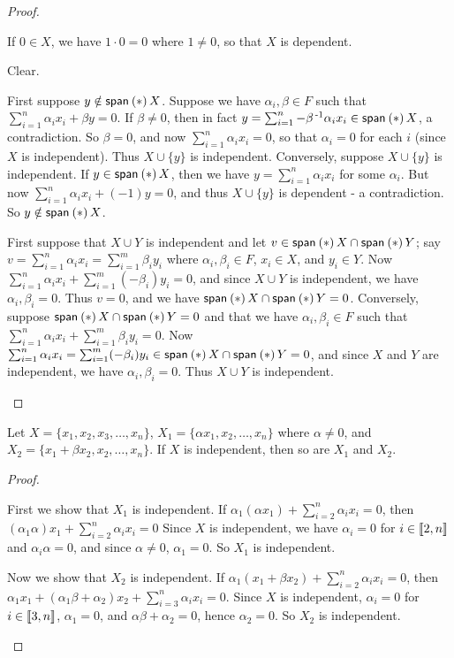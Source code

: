 \documentclass{memoir}
\begin{document}
\begin{proof} \mbox{}
\begin{enumerate*}
\item If $0 \in X$, we have $1 \cdot 0 = 0$ where $1 \neq 0$, so that $X$ is dependent.
\item Clear.
\item First suppose $y \notin \operatorname{\mathsf{span}}_{}\left(*\right){X}$. Suppose we have $\alpha_i,\beta \in F$ such that $\sum_{i=1}^n \alpha_i x_i + \beta y = 0$. If $\beta \neq 0$, then in fact $y = \sum_{i=1}^n -\beta^{{\,\text{-}1}} \alpha_i x_i \in \operatorname{\mathsf{span}}_{}\left(*\right){X}$, a contradiction. So $\beta = 0$, and now $\sum_{i=1}^n \alpha_i x_i = 0$, so that $\alpha_i = 0$ for each $i$ (since $X$ is independent). Thus $X \cup \{y\}$ is independent. Conversely, suppose $X \cup \{y\}$ is independent. If $y \in \operatorname{\mathsf{span}}_{}\left(*\right){X}$, then we have $y = \sum_{i=1}^n \alpha_i x_i$ for some $\alpha_i$. But now $\sum_{i=1}^n \alpha_i x_i + (-1)y = 0$, and thus $X \cup \{y\}$ is dependent - a contradiction. So $y \notin \operatorname{\mathsf{span}}_{}\left(*\right){X}$.
\item First suppose that $X \cup Y$ is independent and let $v \in \operatorname{\mathsf{span}}_{}\left(*\right){X} \cap \operatorname{\mathsf{span}}_{}\left(*\right){Y}$; say $v = \sum_{i=1}^n \alpha_i x_i = \sum_{i=1}^m \beta_i y_i$ where $\alpha_i,\beta_i \in F$, $x_i \in X$, and $y_i \in Y$. Now $\sum_{i=1}^n \alpha_i x_i + \sum_{i=1}^m (-\beta_i)y_i = 0$, and since $X \cup Y$ is independent, we have $\alpha_i,\beta_i = 0$. Thus $v = 0$, and we have $\operatorname{\mathsf{span}}_{}\left(*\right){X} \cap \operatorname{\mathsf{span}}_{}\left(*\right){Y} = 0$. Conversely, suppose $\operatorname{\mathsf{span}}_{}\left(*\right){X} \cap \operatorname{\mathsf{span}}_{}\left(*\right){Y} = 0$ and that we have $\alpha_i, \beta_i \in F$ such that $\sum_{i=1}^n \alpha_i x_i + \sum_{i=1}^m \beta_i y_i = 0$. Now $\sum_{i=1}^n \alpha_i x_i = \sum_{i=1}^m (-\beta_i) y_i \in \operatorname{\mathsf{span}}_{}\left(*\right){X} \cap \operatorname{\mathsf{span}}_{}\left(*\right){Y} = 0$, and since $X$ and $Y$ are independent, we have $\alpha_i,\beta_i = 0$. Thus $X \cup Y$ is independent. \qedhere
\end{enumerate*}
\end{proof}

\begin{prp}
Let $X = \{x_1,x_2,x_3,\ldots,x_n\}$, $X_1 = \{\alpha x_1,x_2,\ldots,x_n\}$ where $\alpha \neq 0$, and $X_2 = \{x_1 + \beta x_2,x_2,\ldots,x_n\}$. If $X$ is independent, then so are $X_1$ and $X_2$.
\end{prp}

\begin{proof} \mbox{}
\begin{enumerate*}
\item First we show that $X_1$ is independent. If $\alpha_1 (\alpha x_1) + \sum_{i=2}^n \alpha_i x_i = 0$, then $(\alpha_1 \alpha) x_1 + \sum_{i=2}^n \alpha_i x_i = 0$ Since $X$ is independent, we have $\alpha_i = 0$ for $i \in \llbracket 2, n \rrbracket$ and $\alpha_i \alpha = 0$, and since $\alpha \neq 0$, $\alpha_1 = 0$. So $X_1$ is independent.
\item Now we show that $X_2$ is independent. If $\alpha_1 (x_1 + \beta x_2) + \sum_{i=2}^n \alpha_i x_i = 0$, then $\alpha_1 x_1 + (\alpha_1\beta + \alpha_2) x_2 + \sum_{i=3}^n \alpha_i x_i = 0$. Since $X$ is independent, $\alpha_i = 0$ for $i \in \llbracket 3, n \rrbracket$, $\alpha_1 = 0$, and $\alpha\beta + \alpha_2 = 0$, hence $\alpha_2 = 0$. So $X_2$ is independent. \qedhere
\end{enumerate*}
\end{proof}
\end{document}
